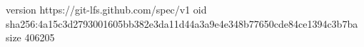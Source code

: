 version https://git-lfs.github.com/spec/v1
oid sha256:4a15c3d2793001605bb382e3da11d44a3a9e4e348b77650cde84ce1394c3b7ba
size 406205
